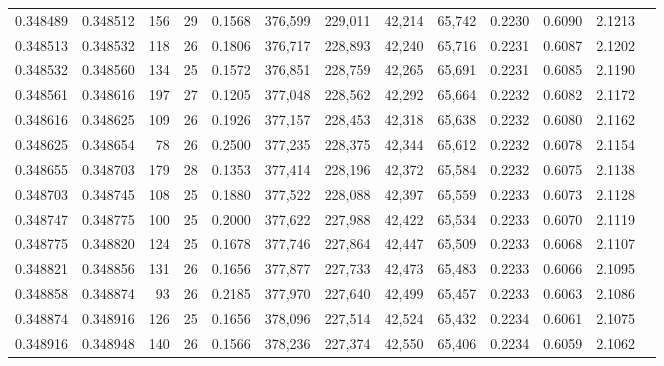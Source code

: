 \begin{tabular}{rrrrrrrrrrrrr}
0.348489 & 0.348512 &   156 &  29 &                                     0.1568 & 376,599 & 229,011 &  42,214 &  65,742 & 0.2230 & 0.6090 & 2.1213 \\
0.348513 & 0.348532 &   118 &  26 &                                     0.1806 & 376,717 & 228,893 &  42,240 &  65,716 & 0.2231 & 0.6087 & 2.1202 \\
0.348532 & 0.348560 &   134 &  25 &                                     0.1572 & 376,851 & 228,759 &  42,265 &  65,691 & 0.2231 & 0.6085 & 2.1190 \\
0.348561 & 0.348616 &   197 &  27 &                                     0.1205 & 377,048 & 228,562 &  42,292 &  65,664 & 0.2232 & 0.6082 & 2.1172 \\
0.348616 & 0.348625 &   109 &  26 &                                     0.1926 & 377,157 & 228,453 &  42,318 &  65,638 & 0.2232 & 0.6080 & 2.1162 \\
0.348625 & 0.348654 &    78 &  26 &                                     0.2500 & 377,235 & 228,375 &  42,344 &  65,612 & 0.2232 & 0.6078 & 2.1154 \\
0.348655 & 0.348703 &   179 &  28 &                                     0.1353 & 377,414 & 228,196 &  42,372 &  65,584 & 0.2232 & 0.6075 & 2.1138 \\
0.348703 & 0.348745 &   108 &  25 &                                     0.1880 & 377,522 & 228,088 &  42,397 &  65,559 & 0.2233 & 0.6073 & 2.1128 \\
0.348747 & 0.348775 &   100 &  25 &                                     0.2000 & 377,622 & 227,988 &  42,422 &  65,534 & 0.2233 & 0.6070 & 2.1119 \\
0.348775 & 0.348820 &   124 &  25 &                                     0.1678 & 377,746 & 227,864 &  42,447 &  65,509 & 0.2233 & 0.6068 & 2.1107 \\
0.348821 & 0.348856 &   131 &  26 &                                     0.1656 & 377,877 & 227,733 &  42,473 &  65,483 & 0.2233 & 0.6066 & 2.1095 \\
0.348858 & 0.348874 &    93 &  26 &                                     0.2185 & 377,970 & 227,640 &  42,499 &  65,457 & 0.2233 & 0.6063 & 2.1086 \\
0.348874 & 0.348916 &   126 &  25 &                                     0.1656 & 378,096 & 227,514 &  42,524 &  65,432 & 0.2234 & 0.6061 & 2.1075 \\
0.348916 & 0.348948 &   140 &  26 &                                     0.1566 & 378,236 & 227,374 &  42,550 &  65,406 & 0.2234 & 0.6059 & 2.1062 \\

\end{tabular}
